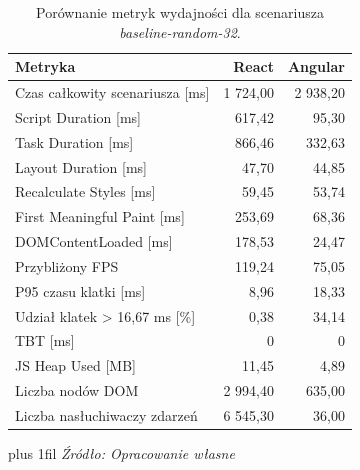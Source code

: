 \documentclass[12pt,openright,twoside]{report}
\newcommand{\source}[1]{{\par\vspace{5pt}\noindent\leftskip=0pt \rightskip=0pt \parfillskip=0pt plus 1fil \footnotesize\textit{Źródło: #1}\par}}
\begin{document}
\FloatBarrier
\begin{table}[H]
\centering
\caption{Porównanie metryk wydajności dla scenariusza \textit{baseline-random-32}.}
\label{tab:baseline-results}
\begin{tabular}{|l|r|r|}
\hline
\textbf{Metryka} & \textbf{React} & \textbf{Angular} \\
\hline
Czas całkowity scenariusza [ms] & 1 724,00 & 2 938,20 \\
Script Duration [ms] & 617,42 & 95,30 \\
Task Duration [ms] & 866,46 & 332,63 \\
Layout Duration [ms] & 47,70 & 44,85 \\
Recalculate Styles [ms] & 59,45 & 53,74 \\
First Meaningful Paint [ms] & 253,69 & 68,36 \\
DOMContentLoaded [ms] & 178,53 & 24,47 \\
Przybliżony FPS & 119,24 & 75,05 \\
P95 czasu klatki [ms] & 8,96 & 18,33 \\
Udział klatek > 16,67 ms [\%] & 0,38 & 34,14 \\
TBT [ms] & 0 & 0 \\
JS Heap Used [MB] & 11,45 & 4,89 \\
Liczba nodów DOM & 2 994,40 & 635,00 \\
Liczba nasłuchiwaczy zdarzeń & 6 545,30 & 36,00 \\
\hline
\end{tabular}
\source{Opracowanie własne}
\end{table}
\end{document}
